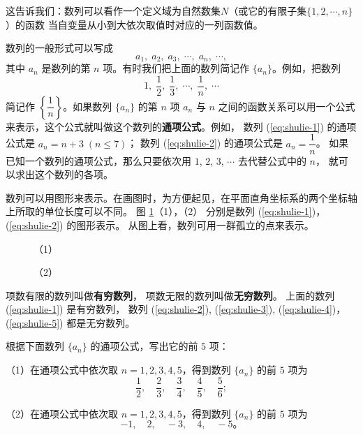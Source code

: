 这告诉我们：数列可以看作一个定义域为自然数集$N$（或它的有限子集$\{1, 2, \cdots, n\}$）的函数
当自变量从小到大依次取值时对应的一列函数值。

数列的一般形式可以写成
$$ a_1,\; a_2,\; a_3,\; \cdots,\; a_n,\; \cdots, $$
其中 $a_n$ 是数列的第 $n$ 项。有时我们把上面的数列简记作 $\{a_n\}$。例如，把数列
$$ 1,\; \dfrac{1}{2},\; \dfrac{1}{3},\; \cdots,\; \dfrac{1}{n},\; \cdots $$
简记作 $\left\{ \dfrac{1}{n} \right\}$。如果数列 $\{a_n\}$ 的第 $n$ 项 $a_n$ 与 $n$
之间的函数关系可以用一个公式来表示，这个公式就叫做这个数列的\textbf{通项公式}。例如，
数列 (\ref{eq:shulie-1}) 的通项公式是 $a_n = n + 3 \;(n \leqslant 7)$；
数列 (\ref{eq:shulie-2}) 的通项公式是 $a_n = \dfrac{1}{n}$。
如果已知一个数列的通项公式，那么只要依次用 $1$, $2$, $3$, $\cdots$ 去代替公式中的 $n$，
就可以求出这个数列的各项。

数列可以用图形来表示。在画图时，为方便起见，在平面直角坐标系的两个坐标轴上所取的单位长度可以不同。
图 \ref{fig:2-2}（1），（2） 分别是数列 (\ref{eq:shulie-1})， (\ref{eq:shulie-2}) 的图形表示。
从图上看，数列可用一群孤立的点来表示。

\begin{figure}[htbp]
    \centering
    \begin{minipage}{8cm}
    \centering
    
    \caption*{（1）}
    \end{minipage}
    \qquad
    \begin{minipage}{8cm}
    \centering
    
    \caption*{（2）}
    \end{minipage}
    \caption{}\label{fig:2-2}
\end{figure}

项数有限的数列叫做\textbf{有穷数列}，
项数无限的数列叫做\textbf{无穷数列}。
上面的数列 (\ref{eq:shulie-1}) 是有穷数列， 数列 (\ref{eq:shulie-2}), (\ref{eq:shulie-3}),
(\ref{eq:shulie-4})，(\ref{eq:shulie-5}) 都是无穷数列。


\liti 根据下面数列 $\{a_n\}$ 的通项公式，写出它的前 $5$ 项：
\begin{xiaoxiaotis}


\end{xiaoxiaotis}

\jie （1）在通项公式中依次取 $n = 1, 2, 3, 4, 5$，得到数列 $\{a_n\}$ 的前 $5$ 项为
$$ \dfrac{1}{2},\quad \dfrac{2}{3},\quad \dfrac{3}{4},\quad \dfrac{4}{5},\quad \dfrac{5}{6} ; $$

（2）在通项公式中依次取 $n = 1, 2, 3, 4, 5$，得到数列 $\{a_n\}$ 的前 $5$ 项为
$$ -1,\quad 2,\quad -3,\quad 4,\quad -5 \text{。} $$

